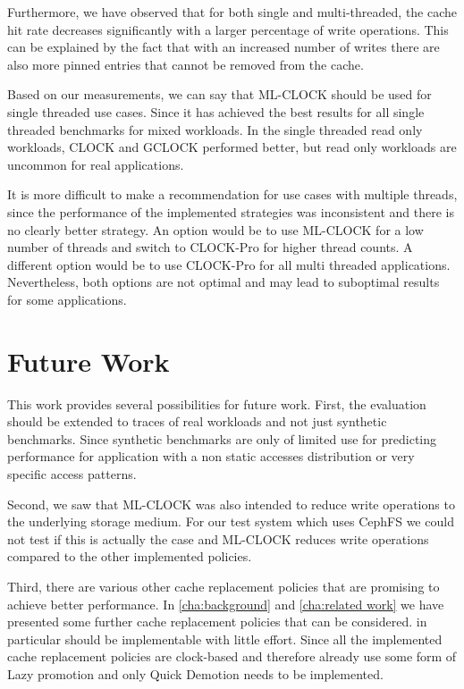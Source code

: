 \documentclass[
	12pt,
	a4paper,
	abstract,
	bibliography=totoc,
	chapterprefix,
	headings=openright,
	numbers=endperiod,
	parskip=half,
	twoside,
]{scrreprt}
\begin{document}
Furthermore, we have observed that for both single and multi-threaded, 
the cache hit rate decreases significantly with a larger percentage of write operations.
This can be explained by the fact that with an increased number of writes there are 
also more pinned entries that cannot be removed from the cache.

Based on our measurements, we can say that ML-CLOCK should be used for single threaded use cases.
Since it has achieved the best results for all single threaded benchmarks for mixed workloads. 
In the single threaded read only workloads, CLOCK and GCLOCK performed better, 
but read only workloads are uncommon for real applications. 

It is more difficult to make a recommendation for use cases with multiple threads, 
since the performance of the implemented strategies was inconsistent and there is no clearly better strategy.
An option would be to use ML-CLOCK for a low number of threads and switch to CLOCK-Pro 
for higher thread counts.
A different option would be to use CLOCK-Pro for all multi threaded applications.
Nevertheless, both options are not optimal and may lead to suboptimal results for some applications.

\section{Future Work}

This work provides several possibilities for future work.
First, the evaluation should be extended to traces of real workloads and not just synthetic benchmarks.
Since synthetic benchmarks are only of limited use for predicting performance for  
application with a non static accesses distribution or very specific access patterns.

Second, we saw that ML-CLOCK was also intended to reduce write operations to the underlying storage medium.
For our test system which uses CephFS we could not test if this is actually the case and ML-CLOCK reduces write operations
compared to the other implemented policies.

Third, there are various other cache replacement policies that are promising to achieve better performance.
In \cref{cha:background} and \cref{cha:related work} we have presented some further cache replacement policies 
that can be considered.
in particular \cite{yang2023fifo} should be implementable with little effort.
Since all the implemented cache replacement policies are clock-based and therefore already 
use some form of Lazy promotion and only Quick Demotion needs to be implemented.
\end{document}
